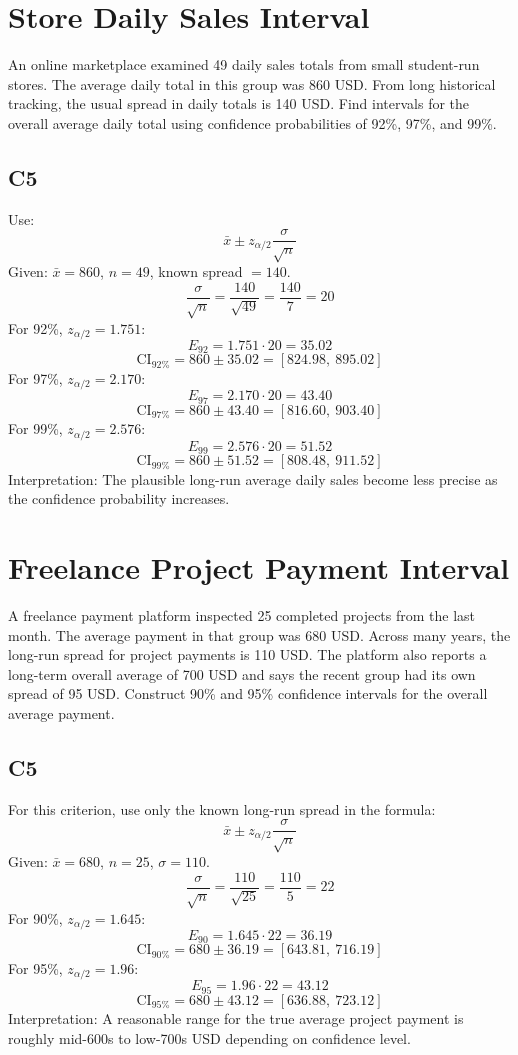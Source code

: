 \begin{ExamProblems}
		\newpage
		\item

		\section{Store Daily Sales Interval}
		An online marketplace examined 49 daily sales totals from small student-run stores.
		The average daily total in this group was 860 USD.
		From long historical tracking, the usual spread in daily totals is 140 USD.
		Find intervals for the overall average daily total using confidence probabilities of 92\%, 97\%, and 99\%.

		\subsection*{C5}
		Use:
		\[
		\bar{x} \pm z_{\alpha/2}\frac{\sigma}{\sqrt{n}}
		\]
		Given: $\bar{x}=860$, $n=49$, known spread $=140$.
		\[
		\frac{\sigma}{\sqrt{n}}=\frac{140}{\sqrt{49}}=\frac{140}{7}=20
		\]
		For 92\%, $z_{\alpha/2}=1.751$:
		\[
		E_{92}=1.751\cdot 20=35.02
		\]
		\[
		\text{CI}_{92\%}=860\pm 35.02=[824.98,\ 895.02]
		\]
		For 97\%, $z_{\alpha/2}=2.170$:
		\[
		E_{97}=2.170\cdot 20=43.40
		\]
		\[
		\text{CI}_{97\%}=860\pm 43.40=[816.60,\ 903.40]
		\]
		For 99\%, $z_{\alpha/2}=2.576$:
		\[
		E_{99}=2.576\cdot 20=51.52
		\]
		\[
		\text{CI}_{99\%}=860\pm 51.52=[808.48,\ 911.52]
		\]
		Interpretation: The plausible long-run average daily sales become less precise as the confidence probability increases.

		\newpage
		\item
		\section{Freelance Project Payment Interval}
		A freelance payment platform inspected 25 completed projects from the last month.
		The average payment in that group was 680 USD.
		Across many years, the long-run spread for project payments is 110 USD.
		The platform also reports a long-term overall average of 700 USD and says the recent group had its own spread of 95 USD.
		Construct 90\% and 95\% confidence intervals for the overall average payment.

		\subsection*{C5}
		For this criterion, use only the known long-run spread in the formula:
		\[
		\bar{x} \pm z_{\alpha/2}\frac{\sigma}{\sqrt{n}}
		\]
		Given: $\bar{x}=680$, $n=25$, $\sigma=110$.
		\[
		\frac{\sigma}{\sqrt{n}}=\frac{110}{\sqrt{25}}=\frac{110}{5}=22
		\]
		For 90\%, $z_{\alpha/2}=1.645$:
		\[
		E_{90}=1.645\cdot 22=36.19
		\]
		\[
		\text{CI}_{90\%}=680\pm 36.19=[643.81,\ 716.19]
		\]
		For 95\%, $z_{\alpha/2}=1.96$:
		\[
		E_{95}=1.96\cdot 22=43.12
		\]
		\[
		\text{CI}_{95\%}=680\pm 43.12=[636.88,\ 723.12]
		\]
		Interpretation: A reasonable range for the true average project payment is roughly mid-600s to low-700s USD depending on confidence level.


\end{ExamProblems}
